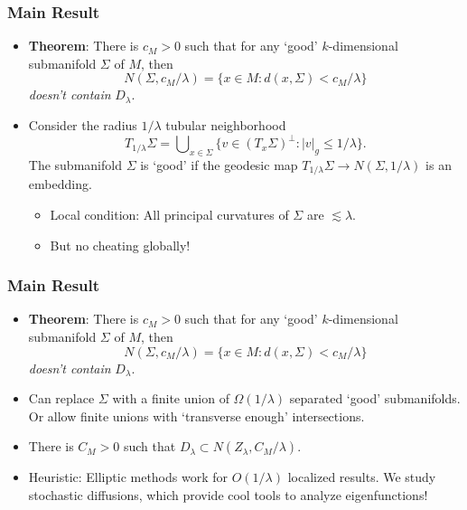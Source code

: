 \documentclass[usenames,dvipsnames,12pt]{beamer}
\begin{document}
\begin{frame}
    \frametitle{Main Result}

    \begin{itemize}
        \item {\bf Theorem}: There is $c_M > 0$ such that for any `good' $k$-dimensional submanifold $\Sigma$ of $M$, then
        \[ N(\Sigma, c_M / \lambda) = \{ x \in M : d(x,\Sigma) < c_M / \lambda \} \]
        \emph{doesn't contain} $D_\lambda$.

        \item Consider the radius $1/\lambda$ tubular neighborhood
        \[ T_{1/\lambda} \Sigma = \bigcup\nolimits_{x \in \Sigma} \{ v \in (T_x \Sigma)^\perp: |v|_g \leq 1/\lambda \}. \]
        The submanifold $\Sigma$ is `good' if the geodesic map $T_{1/\lambda} \Sigma \to N(\Sigma, 1/\lambda)$ is an embedding.

        \begin{itemize}
            \item Local condition: All principal curvatures of $\Sigma$ are $\lesssim \lambda$.

            \item But no cheating globally!
        \end{itemize}
    \end{itemize}
\end{frame}

\begin{frame}
    \frametitle{Main Result}

    \begin{itemize}
        \item {\bf Theorem}: There is $c_M > 0$ such that for any `good' $k$-dimensional submanifold $\Sigma$ of $M$, then
        \[ N(\Sigma, c_M / \lambda) = \{ x \in M : d(x,\Sigma) < c_M / \lambda \} \]
        \emph{doesn't contain} $D_\lambda$.

        \item Can replace $\Sigma$ with a finite union of $\Omega(1/\lambda)$ separated `good' submanifolds. Or allow finite unions with `transverse enough' intersections.

        \item There is $C_M > 0$ such that $D_\lambda \subset N(Z_\lambda, C_M/\lambda)$.

        \item Heuristic: Elliptic methods work for $O(1/\lambda)$ localized results. We study stochastic diffusions, which provide cool tools to analyze eigenfunctions!
    \end{itemize}
\end{frame}
\end{document}
